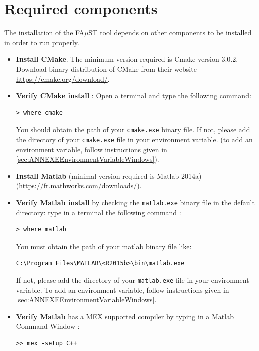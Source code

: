 \section{Required components}\label{sec:WinRequired}
The installation of the FA$\mu$ST tool depends on other components to be installed in order to run properly. 

\begin{itemize}
\item \textbf{Install CMake}. The minimum version required is Cmake version 3.0.2. Download binary distribution of CMake from their website \url{https://cmake.org/download/}.
\item \textbf{Verify CMake install} : Open a terminal and type the following command:
\lstset{style=customBash}
\begin{lstlisting}
> where cmake
\end{lstlisting}
You should obtain the path of your \texttt{cmake.exe} binary file. If not, please add the directory of your \texttt{cmake.exe} file in your environment variable. (to add an environment variable, follow instructions given in \ref{sec:ANNEXEEnvironmentVariableWindows}). 

\item \textbf{Install Matlab} (minimal version required is Matlab 2014a) (\url{https://fr.mathworks.com/downloads/}). 

\item \textbf{Verify Matlab install} by checking the \texttt{matlab.exe} binary file in the default directory:  type in a terminal the following command : 
\lstset{style=customBash}
\begin{lstlisting}
> where matlab
\end{lstlisting}
You must obtain the path of your matlab binary file like: 
\begin{lstlisting}
C:\Program Files\MATLAB\<R2015b>\bin\matlab.exe
\end{lstlisting}
If not, please add the directory of your \texttt{matlab.exe} file in your environment variable. To add an environment variable, follow instructions given in \ref{sec:ANNEXEEnvironmentVariableWindows}.\\

\item \textbf{Verify Matlab} has a MEX supported compiler by typing in a Matlab Command Window :
\lstset{style=customMatlab}
\begin{lstlisting}
>> mex -setup C++
\end{lstlisting}


\end{itemize}
